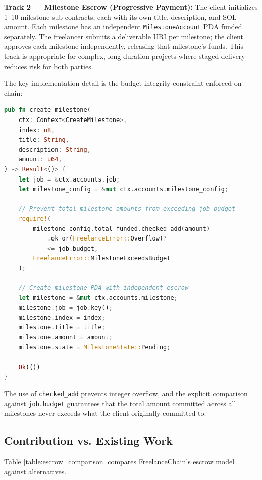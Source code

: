 \textbf{Track 2 --- Milestone Escrow (Progressive Payment):} The client initializes 1--10 milestone sub-contracts, each with its own title, description, and SOL amount. Each milestone has an independent \texttt{MilestoneAccount} PDA funded separately. The freelancer submits a deliverable URI per milestone; the client approves each milestone independently, releasing that milestone's funds. This track is appropriate for complex, long-duration projects where staged delivery reduces risk for both parties.

The key implementation detail is the budget integrity constraint enforced on-chain:

\begin{lstlisting}[language=Rust, caption={Milestone budget validation in Anchor}, label={lst:milestone_validation}]
pub fn create_milestone(
    ctx: Context<CreateMilestone>,
    index: u8,
    title: String,
    description: String,
    amount: u64,
) -> Result<()> {
    let job = &ctx.accounts.job;
    let milestone_config = &mut ctx.accounts.milestone_config;

    // Prevent total milestone amounts from exceeding job budget
    require!(
        milestone_config.total_funded.checked_add(amount)
            .ok_or(FreelanceError::Overflow)?
            <= job.budget,
        FreelanceError::MilestoneExceedsBudget
    );

    // Create milestone PDA with independent escrow
    let milestone = &mut ctx.accounts.milestone;
    milestone.job = job.key();
    milestone.index = index;
    milestone.title = title;
    milestone.amount = amount;
    milestone.state = MilestoneState::Pending;

    Ok(())
}
\end{lstlisting}

The use of \texttt{checked\_add} prevents integer overflow, and the explicit comparison against \texttt{job.budget} guarantees that the total amount committed across all milestones never exceeds what the client originally committed to.

\subsection{Contribution vs. Existing Work}

Table \ref{table:escrow_comparison} compares FreelanceChain's escrow model against alternatives.

